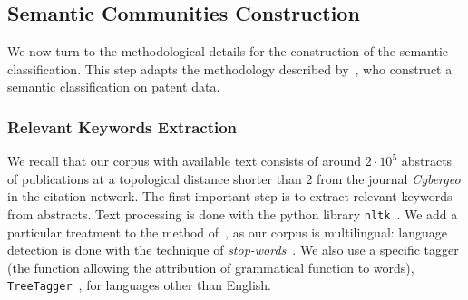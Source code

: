 %
%
%
%










\subsection*{Semantic Communities Construction}

We now turn to the methodological details for the construction of the semantic classification. This step adapts the methodology described by~\cite{bergeaud2017classifying}, who construct a semantic classification on patent data.

\subsubsection*{Relevant Keywords Extraction}

We recall that our corpus with available text consists of around $2\cdot 10^5$ abstracts of publications at a topological distance shorter than 2 from the journal \textit{Cybergeo} in the citation network. The first important step is to extract relevant keywords from abstracts. Text processing is done with the python library \texttt{nltk}~\citep{bird2006nltk}. We add a particular treatment to the method of~\cite{bergeaud2017classifying}, as our corpus is multilingual: language detection is done with the technique of \emph{stop-words}~\citep{baldwin2010language}. We also use a specific tagger (the function allowing the attribution of grammatical function to words), \texttt{TreeTagger}~\citep{schmid1994probabilistic}, for languages other than English.


